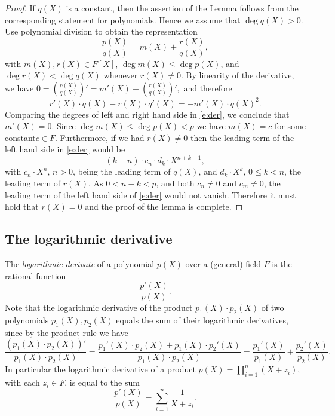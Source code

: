 \documentclass[11pt]{article}
\theoremstyle{definition}
\theoremstyle{remark}
\begin{document}
\begin{proof}
If $q(X)$ is a constant, then the assertion of the Lemma follows from the corresponding statement for polynomials.
Hence we assume that $\deg q(X)>0$.
Use polynomial division to obtain the representation
\[
\frac{p(X)}{q(X)} = m(X) + \frac{r(X)}{q(X)},
\]
with $m(X), r(X) \in F[X]$, $\deg m(X) \leq \deg p(X)$, and $\deg r(X) < \deg q(X)$ whenever $r(X)\neq 0$.
By linearity of the derivative, we have
$
0 =  \left(\frac{p(X)}{q(X)}\right)' = m'(X) + \left(\frac{r(X)}{q(X)}\right)',
$
and therefore
\begin{equation}
\label{e:der}
r'(X)\cdot q(X) - r(X)\cdot q'(X) = - m'(X)\cdot q(X)^2.
\end{equation}
Comparing the degrees of left and right hand side in \eqref{e:der}, we conclude that  $m'(X) = 0$.
Since $\deg m(X) \leq  \deg p(X) < p$ we have $m(X)= c$ for some constant\footnotemark $c\in F$. 
% 
Furthermore, if we had $r(X)\neq 0$ then the leading term of the left hand side in \eqref{e:der} would be
\[
(k - n) \cdot c_n\cdot d_{k} \cdot X^{n + k - 1},
\]
with $c_n \cdot X^n$, $n>0$, being the leading term of $q(X)$, and  $d_k \cdot X^k$, $0\leq k < n$, the leading term of $r(X)$.
As  $0 < n - k < p$, and both $c_n\neq 0$ and $c_m\neq 0$, the leading term of the left hand side of \eqref{e:der} would not vanish.
Therefore it must hold that  $r(X) = 0$ and the proof of the lemma is complete.
\end{proof}


\subsection{The  logarithmic derivative}

The \textit{logarithmic derivate} of a polynomial $p(X)$ over a (general) field $F$ is the rational function
\begin{equation*}
\frac{p'(X)}{p(X)}.
\end{equation*}
Note that the logarithmic derivative of the product $p_1(X)\cdot p_2(X)$ of two polynomials $p_1(X), p_2(X)$ equals the sum of their logarithmic derivatives, since by the product rule we have 
\[
\frac{(p_1(X)\cdot p_2(X))'}{p_1(X)\cdot p_2(X)} = \frac{p_1'(X)\cdot p_2(X) + p_1(X)\cdot p_2'(X)}{p_1(X)\cdot p_2(X)} 
= \frac{p_1'(X)}{p_1(X)} + \frac{p_2'(X)}{p_2(X)}.
\]
In particular the logarithmic derivative of a product $p(X) = \prod_{i=1}^n (X + z_i)$, with each $z_i\in F$, is equal to the sum
\begin{equation}
\label{e:LogDerivativeProduct}
\frac{p'(X)}{p(X)} %
= \sum_{i=1}^n \frac{1}{X + z_i}.
\end{equation}
\end{document}
